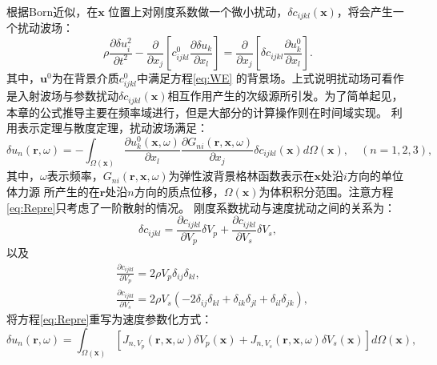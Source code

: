 根据Born近似，在$\mathbf{x}$ 位置上对刚度系数做一个微小扰动，$\delta
c_{ijkl}(\mathbf{x})$，将会产生一个扰动波场：
\begin{equation}
	\rho \frac{\partial \delta u^2_i}{\partial t^2}  -
	\frac{\partial}{\partial x_j}\left[c^0_{ijkl}\frac{\partial \delta u_{k}}{\partial
	x_l}\right]=\frac{\partial}{\partial
	x_j}\left[\delta c_{ijkl}\frac{\partial
	u^0_{k}}{\partial x_l}\right]. 
	\label{eq:BornApp}
\end{equation}
其中，$\mathbf{u}^0$为在背景介质$c^0_{ijkl}$中满足方程\eqref{eq:WE}
的背景场。上式说明扰动场可看作是入射波场与参数扰动$\delta
c_{ijkl}(\mathbf{x})$相互作用产生的次级源所引发。为了简单起见，本章的公式推导主要在频率域进行，但是大部分的计算操作则在时间域实现。
利用表示定理与散度定理\cite{kamath2016elastic}，扰动波场满足：
\begin{equation}
	\delta u_n(\mathbf{r},\omega)=-\int_{\Omega(\mathbf{x})}{\frac{\partial
	u^0_{k}(\mathbf{x},\omega)}{\partial x_l}
	\frac{\partial G_{ni}(\mathbf{r},\mathbf{x},\omega)}{\partial
	x_j} \delta
	c_{ijkl}(\mathbf{x})}
	d\Omega(\mathbf{x}), \quad (n=1,2,3),
	\label{eq:Repre}
\end{equation}
其中，$\omega$表示频率，$G_{ni}(\mathbf{r},\mathbf{x},\omega)$为弹性波背景格林函数表示在$\mathbf{x}$处沿$i$方向的单位体力源
所产生的在$\mathbf{r}$处沿$n$方向的质点位移，$\Omega(\mathbf{x})$为体积积分范围。注意方程\eqref{eq:Repre}只考虑了一阶散射的情况。
刚度系数扰动与速度扰动之间的关系为：
\begin{equation}
        \delta c_{ijkl}=\frac{\partial c_{ijkl}}{\partial V_p}\delta V_p
        +\frac{\partial c_{ijkl}}{\partial V_s}\delta V_s,
        \label{eq:deltaLame}
\end{equation}
以及
\begin{equation}
        \begin{split}
                &\frac{\partial c_{ijkl}}{\partial V_p}=2\rho V_p\delta_{ij}\delta_{kl},\\
                &\frac{\partial c_{ijkl}}{\partial V_s}=2\rho
                V_s(-2\delta_{ij}\delta_{kl}+\delta_{ik}\delta _{jl}+\delta_{il}\delta_{jk}),
        \end{split}
        \label{eq:deltaLame}
\end{equation}
将方程\eqref{eq:Repre}重写为速度参数化方式：
\begin{equation}
        \delta
        u_n(\mathbf{r},\omega)=\int_{\Omega(\mathbf{x})}{\left[J_{n,V_p}(\mathbf{r,x},\omega)\delta
                V_p(\mathbf{x}) +J_{n,V_s}(\mathbf{r,x},\omega)\delta
        V_s(\mathbf{x})\right]
                }
                d\Omega(\mathbf{x}),
        \label{eq:SplitRepre}
\end{equation}

